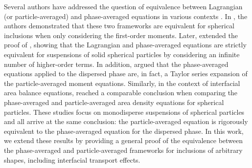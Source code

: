 Several authors have addressed the question of equivalence between Lagrangian (or particle-averaged) and phase-averaged equations in various contexts \citep{zhang1997momentum,lhuillier2000bilan,nott2011suspension}. 
In \citet[Appendix A]{zhang1997momentum}, the authors demonstrated that these two frameworks are equivalent for spherical inclusions when only considering the first-order moments. 
Later, \citet[Appendix A]{nott2011suspension} extended the proof of \citet{zhang1997momentum}, showing that the Lagrangian and phase-averaged equations are strictly equivalent for suspensions of solid spherical particles by considering an infinite number of higher-order terms. 
In addition, \citet{lhuillier2010multiphase} argued that the phase-averaged equations applied to the dispersed phase are, in fact, a Taylor series expansion of the particle-averaged moment equations.
Similarly, in the context of interfacial area balance equations, \citet{lhuillier2000bilan} reached a comparable conclusion when comparing the phase-averaged and particle-averaged area density equations for spherical particles. 
These studies focus on monodisperse suspensions of spherical particles and all arrive at the same conclusion: the particle-averaged equation is rigorously equivalent to the phase-averaged equation for the dispersed phase.
In this work, we extend these results by providing a general proof of the equivalence between the phase-averaged and particle-averaged frameworks for inclusions of arbitrary shapes, including interfacial transport effects.


